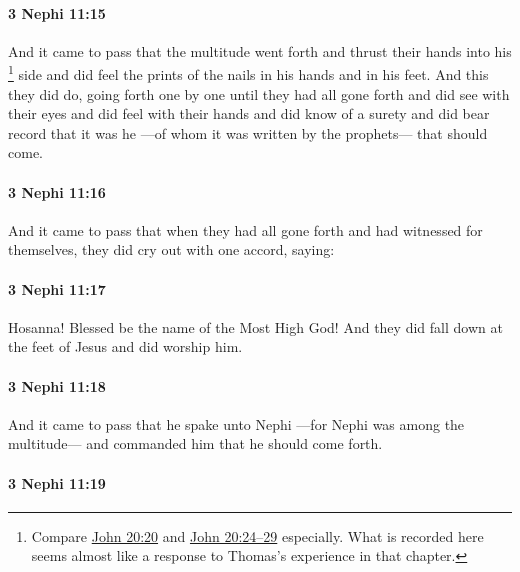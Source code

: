 		\paragraph{3 Nephi 11:15} %
			\label{3NEPHI-11-15}

			And it came to pass that the multitude went forth
			and thrust their hands into his
				\footnote{%
					Compare \hyperref[JOHN-20-20]{John 20:20} and \hyperref[JOHN-20-24]{John 20:24--29} especially. What is recorded here seems almost like a response to Thomas's experience in that chapter.
					}%
			side
			and did feel the prints of the nails in his hands and in his feet.
			And this they did do, going forth one by one
			until they had all gone forth
			and did see with their eyes and did feel with their hands
			and did know of a surety
			and did bear record that it was he
			---of whom it was written by the prophets---
			that should come.

		\paragraph{3 Nephi 11:16} %
			\label{3NEPHI-11-16}

			And it came to pass that
			when they had all gone forth and had witnessed for themselves,
			they did cry out with one accord, saying:

		\paragraph{3 Nephi 11:17} %
			\label{3NEPHI-11-17}

			Hosanna! Blessed be the name of the Most High God!
			And they did fall down at the feet of Jesus and did worship him.

		\paragraph{3 Nephi 11:18} %
			\label{3NEPHI-11-18}

			And it came to pass that he spake unto Nephi
			---for Nephi was among the multitude---
			and commanded him that he should come forth.

		\paragraph{3 Nephi 11:19} %
			\label{3NEPHI-11-19}

